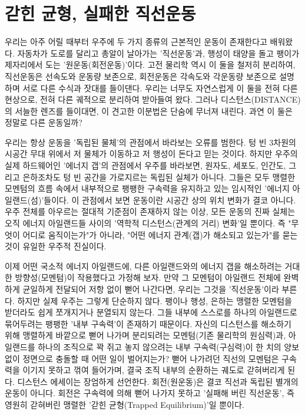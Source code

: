 

\section{갇힌 균형, 실패한 직선운동}
우리는 아주 어릴 때부터 우주에 두 가지 종류의 근본적인 운동이 존재한다고 배워왔다. 자동차가 도로를 달리고 총알이 날아가는 '직선운동'과, 행성이 태양을 돌고 팽이가 제자리에서 도는 '원운동(회전운동)'이다. 고전 물리학 역시 이 둘을 철저히 분리하여, 직선운동은 선속도와 운동량 보존으로, 회전운동은 각속도와 각운동량 보존으로 설명하며 서로 다른 수식과 잣대를 들이댄다. 우리는 너무도 자연스럽게 이 둘을 전혀 다른 현상으로, 전혀 다른 궤적으로 분리하여 받아들여 왔다.
그러나 디스턴스(DISTANCE)의 서늘한 렌즈를 들이대면, 이 견고한 이분법은 단숨에 무너져 내린다. 과연 이 둘은 정말로 다른 운동일까?

우리는 항상 운동을 '독립된 물체'의 관점에서 바라보는 오류를 범한다. 텅 빈 3차원의 시공간 무대 위에서 저 물체가 이동하고 저 행성이 돈다고 믿는 것이다. 하지만 우주의 실제 하드웨어인 '에너지 갭'의 관점에서 우주를 바라보면, 원자도, 세포도, 인간도, 그리고 은하조차도 텅 빈 공간을 가로지르는 독립된 실체가 아니다. 그들은 모두 맹렬한 모멘텀의 흐름 속에서 내부적으로 팽팽한 구속력을 유지하고 있는 임시적인 '에너지 아일랜드(섬)'들이다.
이 관점에서 보면 운동이란 시공간 상의 위치 변화가 결코 아니다. 우주 전체를 아우르는 절대적 기준점이 존재하지 않는 이상, 모든 운동의 진짜 실체는 오직 에너지 아일랜드들 사이의 '역학적 디스턴스(관계의 거리) 변화'일 뿐이다. 즉 "무엇이 어디로 움직이는가"가 아니라, "어떤 에너지 관계(갭)가 해소되고 있는가"를 묻는 것이 유일한 우주적 진실이다.

이제 어떤 국소적 에너지 아일랜드에, 다른 아일랜드와의 에너지 갭을 해소하려는 거대한 방향성(모멘텀)이 작용했다고 가정해 보자. 만약 그 모멘텀이 아일랜드 전체에 완벽하게 균일하게 전달되어 저항 없이 뻗어 나간다면, 우리는 그것을 '직선운동'이라 부른다. 하지만 실제 우주는 그렇게 단순하지 않다. 팽이나 행성, 은하는 맹렬한 모멘텀을 받더라도 쉽게 쪼개지거나 분열되지 않는다. 그들 내부에 스스로를 하나의 아일랜드로 묶어두려는 팽팽한 '내부 구속력'이 존재하기 때문이다.
자신의 디스턴스를 해소하기 위해 맹렬하게 바깥으로 뻗어 나가며 분리되려는 모멘텀(기존 물리학의 원심력)과, 아일랜드를 하나의 조직으로 꽉 쥐고 놓지 않으려는 내부 구속력(구심력)이 한 치의 양보 없이 정면으로 충돌할 때 어떤 일이 벌어지는가? 뻗어 나가려던 직선의 모멘텀은 구속력을 이기지 못하고 꺾여 들어가며, 결국 조직 내부의 순환하는 궤도로 갇혀버리게 된다. 디스턴스 에세이는 장엄하게 선언한다. 회전(원운동)은 결코 직선과 독립된 별개의 운동이 아니다. 회전은 구속력에 의해 뻗어 나가지 못하고 '실패해 버린 직선운동', 즉 영원히 갇혀버린 맹렬한 '갇힌 균형(Trapped Equilibrium)'일 뿐이다.

